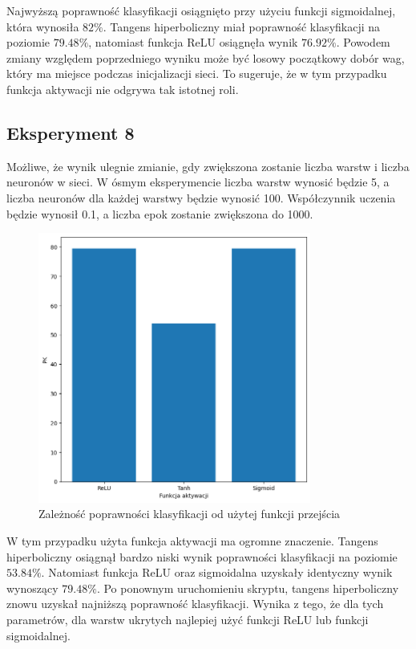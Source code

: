 \documentclass{article}
\begin{document}
Najwyższą poprawność klasyfikacji osiągnięto przy użyciu funkcji sigmoidalnej, która wynosiła $82\%$.
Tangens hiperboliczny miał poprawność klasyfikacji na poziomie $79.48\%$, natomiast funkcja ReLU osiągnęła wynik $76.92\%$.
Powodem zmiany względem poprzedniego wyniku może być losowy początkowy dobór wag, który ma miejsce podczas inicjalizacji sieci.
To sugeruje, że w tym przypadku funkcja aktywacji nie odgrywa tak istotnej roli.

\newpage
\subsection{Eksperyment 8}
Możliwe, że wynik ulegnie zmianie, gdy zwiększona zostanie liczba warstw i liczba neuronów w sieci.
W ósmym eksperymencie liczba warstw wynosić będzie 5, a liczba neuronów dla każdej warstwy będzie wynosić 100.
Współczynnik uczenia będzie wynosił 0.1, a liczba epok zostanie zwiększona do 1000.

\begin{figure}[H]
    \centering
    \includegraphics[width=0.8\textwidth, keepaspectratio]{ACTIVATION_2_1.png}
    \caption{Zależność poprawności klasyfikacji od użytej funkcji przejścia}
    \label{fig:activ_2}
\end{figure}

W tym przypadku użyta funkcja aktywacji ma ogromne znaczenie.
Tangens hiperboliczny osiągnął bardzo niski wynik poprawności klasyfikacji na poziomie $53.84\%$.
Natomiast funkcja ReLU oraz sigmoidalna uzyskały identyczny wynik wynoszący $79.48\%$.
Po ponownym uruchomieniu skryptu, tangens hiperboliczny znowu uzyskał najniższą poprawność klasyfikacji.
Wynika z tego, że dla tych parametrów, dla warstw ukrytych najlepiej użyć funkcji ReLU lub funkcji sigmoidalnej.
\end{document}
